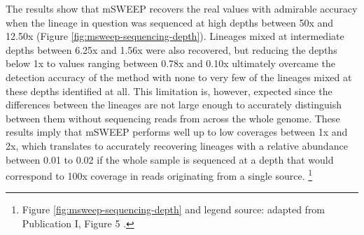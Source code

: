 \documentclass[officiallayout]{tktla}
\let\svthefootnote\thefootnote
\begin{document}
The results show that mSWEEP recovers the real values with
admirable accuracy when the lineage in question was sequenced at high
depths between 50x and 12.50x (Figure
\ref{fig:msweep-sequencing-depth}). Lineages mixed at intermediate
depths between 6.25x and 1.56x were also recovered, but reducing the
depths below 1x to values ranging between 0.78x and 0.10x ultimately
overcame the detection accuracy of the method with none to very few of
the lineages mixed at these depths identified at all. This limitation
is, however, expected since the differences between the lineages are
not large enough to accurately distinguish between them without
sequencing reads from across the whole genome. These results imply
that mSWEEP performs well up to low coverages between 1x and 2x, which
translates to accurately recovering lineages with a relative abundance
between 0.01 to 0.02 if the whole sample is sequenced at a depth that
would correspond to 100x coverage in reads originating from a single
source.
\noindent\let\thefootnote\relax\footnote{Figure \ref{fig:msweep-sequencing-depth} and legend source: adapted from Publication I, Figure 5 \citep{maklin_high-resolution_2021}.}
\addtocounter{footnote}{-1}\let\thefootnote\svthefootnote
\end{document}
